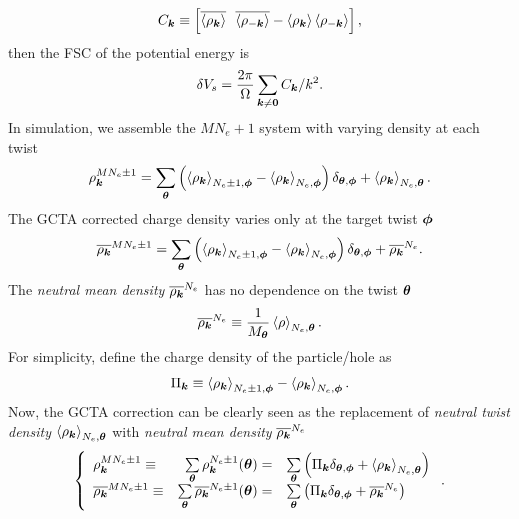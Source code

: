 \begin{align}
C_{\bs{k}} \equiv  \left[ \overline{\braket{\rho_{\bs{k}}}} \ \ \overline{\braket{\rho_{-\bs{k}}}} -
\braket{\rho_{\bs{k}}}\braket{\rho_{-\bs{k}}}
\right], \label{eq:ck}
\end{align}
then the FSC of the potential energy is%
\begin{align}
\delta V_s = \frac{2\pi}{\Omega} \sum_{\boldsymbol{k}\neq\boldsymbol{0}} C_{\boldsymbol{k}}/k^2.
\end{align}
In simulation, we assemble the $MN_e+1$ system with varying density at each twist
\begin{align} \label{eq:rkt}
\rho_{\boldsymbol{k}}^{MN_e\pm 1} = \sum\limits_{\boldsymbol{\theta}}
\left(\braket{\rho_{\boldsymbol{k}}}_{N_e\pm1, \boldsymbol{\phi}}-\braket{\rho_{\boldsymbol{k}}}_{N_e, \boldsymbol{\phi}}\right)\delta_{\boldsymbol{\theta}, \boldsymbol{\phi}}+
\braket{\rho_{\boldsymbol{k}}}_{N_e,\boldsymbol{\theta}}. 
\end{align}
The GCTA corrected charge density varies only at the target twist $\boldsymbol{\phi}$
\begin{align} \label{eq:rkm}
\overline{\rho_{\boldsymbol{k}}}^{MN_e\pm 1} = \sum\limits_{\boldsymbol{\theta}}
\left(\braket{\rho_{\boldsymbol{k}}}_{N_e\pm1, \boldsymbol{\phi}}-\braket{\rho_{\boldsymbol{k}}}_{N_e, \boldsymbol{\phi}}\right)\delta_{\boldsymbol{\theta}, \boldsymbol{\phi}} + \overline{\rho_{\boldsymbol{k}}}^{N_e}.
\end{align}
The \emph{neutral mean density} $\overline{\rho_{\boldsymbol{k}}}^{N_e}$ has no dependence on the twist $\boldsymbol{\theta}$
\begin{align}
\overline{\rho_{\boldsymbol{k}}}^{N_e} \equiv \frac{1}{M_{\boldsymbol{\theta}}} \braket{\rho}_{N_e, \boldsymbol{\theta}}.
\end{align}
For simplicity, define the charge density of the particle/hole as
\begin{align}
\Pi_{\boldsymbol{k}} \equiv \braket{\rho_{\boldsymbol{k}}}_{N_e\pm1, \boldsymbol{\phi}}-\braket{\rho_{\boldsymbol{k}}}_{N_e, \boldsymbol{\phi}}.
\end{align}
Now, the GCTA correction can be clearly seen as the replacement of \emph{neutral twist density} $\braket{\rho_{\boldsymbol{k}}}_{N_e,\boldsymbol{\theta}}$ with \emph{neutral mean density} $\overline{\rho_{\boldsymbol{k}}}^{N_e}$
\begin{align}
\left\{
\begin{array}{lrl}
\rho_{\boldsymbol{k}}^{MN_e\pm 1} \equiv& \sum\limits_{\boldsymbol{\theta}} \rho^{N_e\pm1}_{\boldsymbol{k}}(\boldsymbol{\theta})
=& \sum\limits_{\boldsymbol{\theta}}\left(
\Pi_{\boldsymbol{k}}\delta_{\boldsymbol{\theta}, \boldsymbol{\phi}}+\braket{\rho_{\boldsymbol{k}}}_{N_e,\boldsymbol{\theta}}
\right) \\
\overline{\rho_{\boldsymbol{k}}}^{MN_e\pm 1} \equiv&  \sum\limits_{\boldsymbol{\theta}} \overline{\rho_{\boldsymbol{k}}}^{N_e\pm1}(\boldsymbol{\theta})
=& \sum\limits_{\boldsymbol{\theta}}\left(
\Pi_{\boldsymbol{k}}\delta_{\boldsymbol{\theta}, \boldsymbol{\phi}} + \overline{\rho_{\boldsymbol{k}}}^{N_e}
\right)
\end{array}
\right..
\end{align}
